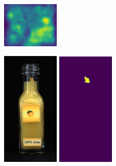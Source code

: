 \begin{figure}[H]
\begin{subfigure}[b]{\textwidth}
\begin{minipage}{0.45\textwidth}
            \includegraphics[width=0.3\textwidth]{figures/appendix/appendix_RevDist/BB/038segment.png}
        \end{minipage}
    \end{subfigure}
    \hfill
    \begin{subfigure}[b]{\textwidth}
        \centering
        \begin{minipage}{0.45\textwidth}
            \centering
            \includegraphics[width=0.3\textwidth]{figures/appendix/appendix_RevDist/JB/007.png}
            \includegraphics[width=0.3\textwidth]{figures/appendix/appendix_RevDist/JB/007_mask.png}

\end{minipage}
\end{subfigure}
\end{figure}

